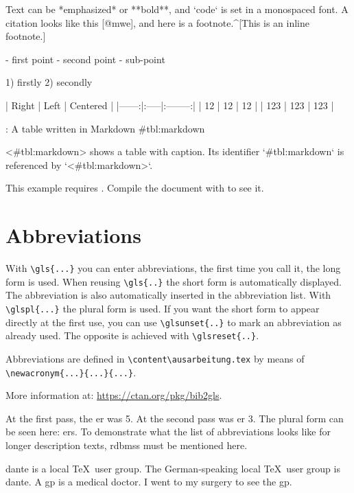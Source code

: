   \begin{ltgexample}
  \begin{markdown}
Text can be *emphasized* or **bold**, and `code` is set in a monospaced font.
A citation looks like this [@mwe], and here is a footnote.^[This is an inline footnote.]

- first point
- second point
  - sub-point

1) firstly
2) secondly

| Right | Left | Centered |
|------:|:-----|:--------:|
|    12 | 12   |    12    |
|   123 | 123  |   123    |

: A table written in Markdown {#tbl:markdown}

<#tbl:markdown> shows a table with caption.
Its identifier `{#tbl:markdown}` is referenced by `<#tbl:markdown>`.
\end{markdown}
  \end{ltgexample}
\else
  This example requires .
  Compile the document with  to see it.
\fi

\section{Abbreviations}

With \verb+\gls{...}+ you can enter abbreviations, the first time you call it, the long form is used.
When reusing \verb+\gls{..}+ the short form is automatically displayed.
The abbreviation is also automatically inserted in the abbreviation list.
With \verb+\glspl{...}+ the plural form is used.
If you want the short form to appear directly at the first use, you can use \verb+\glsunset{..}+ to mark an abbreviation as already used.
The opposite is achieved with \verb+\glsreset{..}+.

Abbreviations are defined in \verb+\content\ausarbeitung.tex+ by means of \verb+\newacronym{...}{...}{...}+.

More information at: \url{https://ctan.org/pkg/bib2gls}.

\begin{ltgexample}
At the first pass, the \gls{er} was 5.
At the second pass was \gls{er} 3.
The plural form can be seen here: \glspl{er}.
To demonstrate what the list of abbreviations looks like for longer description texts, \glspl{rdbms} must be mentioned here.

\gls{dante} is a local \TeX\ user group.
The German-speaking local \TeX\ user group is \gls{dante}.
A \gls{gp} is a medical doctor.
I went to my surgery to see the \gls{gp}.
\end{ltgexample}

